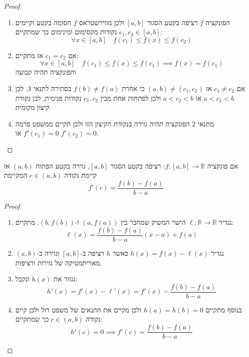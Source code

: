 \documentclass{tstextbook}
\begin{document}
\begin{proof}
  \begin{enumerate}
    \item הפונקציה \(f\) רציפה בקטע הסגור \([a,b]\) ולכן מווירשטראס \(f\) חסומה בקטע וקיימים \(c_{1},c_{2} \in [a,b]\) נקודות מקסימום ומינימום כך שמתקיים: 
$$\forall x \in [a,b]\quad f(c_{1})\leq f(x)\leq f(c_{2})$$


    \item אם \(c_{1}=c_{2}\) אז מתקיים: 
$$\forall x \in[a,b]\quad f(c_{1})\leq f(x)\leq f(c_{1})\implies f(x)=f(c_{1})$$
והפונקציה תהיה קבועה


    \item אם \(c_{1}\neq c_{2}\) אז \((a,b)\neq(c_{1},c_{2})\) כי אחרת \(f(b)\neq f(a)\) בסתירה לתנאי 3. לכן \(a<c_{1}<b\) או \(a<c_{2}<b\) ולכן לפתחות אחת מבין \(c_{1},c_{2}\) נקודות פנימית, לכן נקודת קיצון מקומית. 


    \item מתנאי 2 הפונקציה תהיה גזירה בנקודת הקיצון הזו ולכן תקיים ממשפט פרמה \(f'(c_{1})=0\) או \(f'(c_{2})=0\). 


  \end{enumerate}
\end{proof}
\begin{theorem}[לגרנג']
אם פונקציה \(f:[a,b] \rightarrow \mathbb R\):
 רציפה בקטע הסגור \([a,b]\), גזירה בקטע הפתוח \((a,b)\)
אז קיימת נקודה \(c\in (a,b)\) המקיימת 
$$f'(c)=\frac{f(b)-f(a)}{b-a}$$

\end{theorem}
\begin{proof}
  \begin{enumerate}
    \item נגדיר \(\ell:\mathbb{R}\to \mathbb{R}\) הישר המשיק שמחבר בין \((a,f(a))\) ו-\((b,f(b))\). מתקיים: 
$$\ell(x)=\frac{f(b)-f(a)}{b-a}(x-a)+f(a)$$


    \item נגדיר \(h(x)=f(x)-\ell(x)\) כאשר \(h\) רציפה ב-\([a,b]\) וגזירה ב-\((a,b)\) מאריתמטיקה של גזירות ורציפות. 


    \item נגזור את \(h(x)\) ונקבל: 
$$h'(x)=f'(x)-\ell'(x)=f'(x)- \frac{f(b)-f(a)}{b-a}$$


    \item בנוסף מתקיים \(h(a)=h(b)=0\) ולכן מקיים את התנאים של משפט רול ולכן קיים נקודה \(c \in (a,b)\) כך שמתקיים: 
$$h'(c)=0\implies f'(c)=\frac{f(b)-f(a)}{b-a}$$


  \end{enumerate}
\end{proof}
\end{document}
